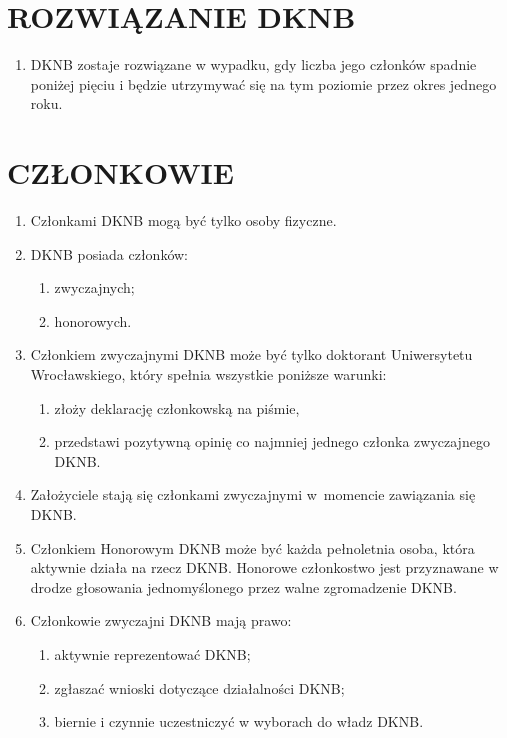 \documentclass{article}
\begin{document}
\section{ROZWIĄZANIE DKNB}
  \begin{enumerate}
    \item DKNB zostaje rozwiązane w wypadku, gdy liczba jego członków spadnie poniżej pięciu i będzie
utrzymywać się na tym poziomie przez okres jednego roku.
  \end{enumerate}


\section{CZŁONKOWIE}
  \begin{enumerate}
  \item Członkami DKNB mogą być tylko osoby fizyczne.
    \item DKNB posiada członków:
      \begin{enumerate}
        \item zwyczajnych;
        \item honorowych.
      \end{enumerate}
    \item Członkiem zwyczajnymi DKNB może być tylko doktorant Uniwersytetu Wrocławskiego, który spełnia wszystkie poniższe warunki:
       \begin{enumerate}
        \item złoży deklarację członkowską na piśmie,
        \item przedstawi pozytywną opinię co najmniej jednego członka zwyczajnego DKNB.
      \end{enumerate}
    \item Założyciele stają się członkami zwyczajnymi w~momencie zawiązania się DKNB.
    \item Członkiem Honorowym DKNB może być każda pełnoletnia osoba, która aktywnie działa na rzecz DKNB. Honorowe członkostwo jest przyznawane w drodze głosowania jednomyślonego przez walne zgromadzenie DKNB.
    \item Członkowie zwyczajni DKNB mają prawo:
      \begin{enumerate}
        \item aktywnie reprezentować DKNB;
        \item zgłaszać wnioski dotyczące działalności DKNB;
        \item biernie i czynnie uczestniczyć w wyborach do władz DKNB.
      \end{enumerate}

\end{enumerate}
\end{document}
